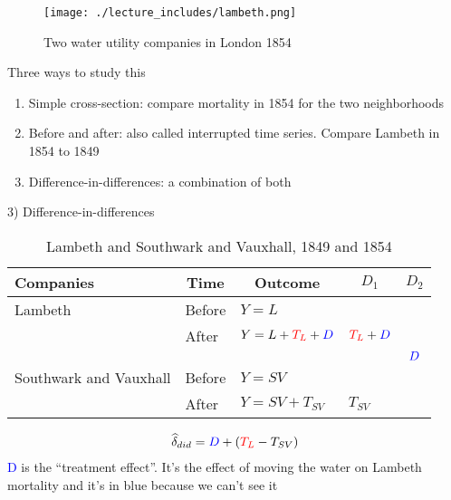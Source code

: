 \documentclass{beamer}
\begin{document}
\begin{frame}

	\begin{figure}
	\caption{Two water utility companies in London 1854}
	\texttt{[image: ./lecture\_includes/lambeth.png]}
	\end{figure}


\end{frame}


\begin{frame}{Three ways to study this}

\begin{enumerate}
\item Simple cross-section: compare mortality in 1854 for the two neighborhoods
\item Before and after: also called interrupted time series. Compare Lambeth in 1854 to 1849
\item Difference-in-differences: a combination of both
\end{enumerate}

\end{frame}



\begin{frame}{3) Difference-in-differences}

\begin{table}\centering
		\caption{Lambeth and Southwark and Vauxhall, 1849 and 1854}
		\begin{center}
		\begin{tabular}{lll|lc}
		\toprule
		\multicolumn{1}{l}{\textbf{Companies}}&
		\multicolumn{1}{c}{\textbf{Time}}&
		\multicolumn{1}{c}{\textbf{Outcome}}&
		\multicolumn{1}{c}{$D_1$}&
		\multicolumn{1}{c}{$D_2$}\\
		\midrule
		Lambeth & Before & $Y=L$ \\
		& After & $Y=L + \textcolor{red}{T_L} + \textcolor{blue}{D}$ & $\textcolor{red}{T_L}+\textcolor{blue}{D}$\\
		\midrule
		& & & & $\textcolor{blue}{D}$ \\
		\midrule
		Southwark and Vauxhall & Before & $Y=SV$ \\
		& After & $Y=SV + T_{SV}$ & $T_{SV}$\\
		\bottomrule
		\end{tabular}
		\end{center}
	\end{table}

\begin{eqnarray*}
\widehat{\delta}_{did} = \textcolor{blue}{D} + (\textcolor{red}{T_L} - T_{SV})
\end{eqnarray*}\textcolor{blue}{D} is the ``treatment effect''.  It's the effect of moving the water on Lambeth mortality and it's in blue because we can't see it 

\end{frame}
\end{document}
